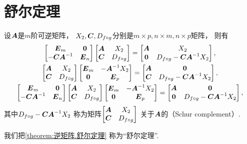 \section{舒尔定理}
\begin{theorem}\label{theorem:逆矩阵.舒尔定理}
设\(\A\)是\(m\)阶可逆矩阵，
\(\B,\C,\D\)分别是\(m \times p, n \times m, n \times p\)矩阵，
则有\begin{gather}
	\begin{bmatrix}
		\E_m & \z \\
		-\C\A^{-1} & \E_n
	\end{bmatrix}
	\begin{bmatrix}
		\A & \B \\
		\C & \D
	\end{bmatrix}
	= \begin{bmatrix}
		\A & \B \\
		\z & \D - \C \A^{-1} \B
	\end{bmatrix},
	\\
	\begin{bmatrix}
		\A & \B \\
		\C & \D
	\end{bmatrix}
	\begin{bmatrix}
		\E_m & -\A^{-1} \B \\
		\z & \E_p
	\end{bmatrix}
	= \begin{bmatrix}
		\A & \z \\
		\C & \D - \C \A^{-1} \B
	\end{bmatrix},
	\\
	\begin{bmatrix}
		\E_m & \z \\
		-\C \A^{-1} & \E_n
	\end{bmatrix}
	\begin{bmatrix}
		\A & \B \\
		\C & \D
	\end{bmatrix}
	\begin{bmatrix}
		\E_m & -\A^{-1} \B \\
		\z & \E_p
	\end{bmatrix}
	= \begin{bmatrix}
		\A & \z \\
		\z & \D - \C \A^{-1} \B
	\end{bmatrix},
\end{gather}
\rm
其中\(\D - \C \A^{-1} \B\)
称为矩阵\(\begin{bmatrix}
	\A & \B \\
	\C & \D
\end{bmatrix}\)
关于\(\A\)的（Schur complement）.
\end{theorem}
我们把\cref{theorem:逆矩阵.舒尔定理} 称为“舒尔定理”.


